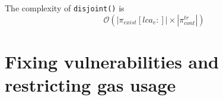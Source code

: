 

The complexity of \texttt{disjoint()} is
\[ \mathcal{O}(|\pi_{exist}[lca_{e}:]| \times
|\pi_{cont}^{tr}|) \]

\section{Fixing vulnerabilities and restricting gas usage}

%
%
